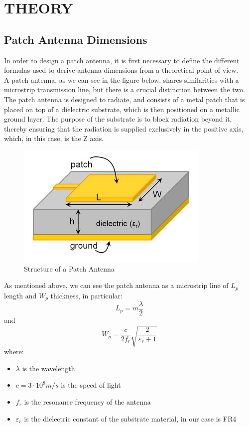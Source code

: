 \documentclass[]{article}
\begin{document}
	\section{THEORY} 
	\subsection{Patch Antenna Dimensions}
	In order to design a patch antenna, it is first necessary to define the different formulas used to derive antenna dimensions from a theoretical point of view.\\
	A patch antenna, as we can see in the figure below, shares similarities with a microstrip transmission line, but there is a crucial distinction between the two. The patch antenna is designed to radiate, and consists of a metal patch that is placed on top of a dielectric substrate, which is then positioned on a metallic ground layer. The purpose of the substrate is to block radiation beyond it, thereby ensuring that the radiation is supplied exclusively in the positive axis, which, in this case, is the Z axis.\\
	\begin{figure}[h]
		\centering
		\includegraphics[width=0.4\linewidth]{img/img1}
		\caption{Structure of a Patch Antenna}
		\label{fig:img1}
	\end{figure}
	
	As mentioned above, we can see the patch antenna as a microstrip line of $L_p$ length and $W_p$ thickness, in particular: 
	\begin{equation}
		L_p=m\frac{\lambda}{2}
	\end{equation} 
	and 
	\begin{equation}
		W_p=\frac{c}{2f_r}\sqrt{\frac{2}{\varepsilon_r+1}}
		\label{Wp}
	\end{equation}
	where: 
	\begin{itemize}
		\item $\lambda$ is the wavelength 
		\item $c=3 \cdot 10^8 m/s$ is the speed of light
		\item $f_r$ is the resonance frequency of the antenna
		\item $\varepsilon_r$ is the dielectric constant of the substrate material, in our case is FR4
		
	\end{itemize}
\end{document}
